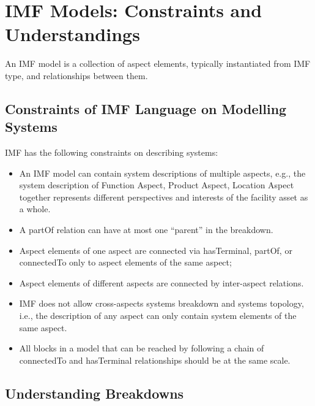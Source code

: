 \documentclass[../main.tex]{subfiles}
\begin{document}
\section{IMF Models: Constraints and Understandings}



An IMF model is a collection of aspect elements, typically instantiated from IMF type, and relationships between them. 


\subsection{Constraints of IMF Language on Modelling Systems}

IMF has the following constraints on describing  systems:
\begin{itemize}
    \item An IMF model can contain system descriptions of multiple aspects, e.g., the system description of Function Aspect, Product Aspect, Location Aspect together represents different perspectives and interests of the facility asset as a whole.
    \item A partOf relation can have at most one ``parent'' in the breakdown.
    \item Aspect elements of one aspect are connected via hasTerminal, partOf, or connectedTo only to aspect elements of the same aspect;
    \item Aspect elements of different aspects are connected by inter-aspect relations.
    \item IMF does not allow cross-aspects systems breakdown and systems topology, i.e., the description of any aspect can only contain system elements of the same aspect.
    \item All blocks in a model that can be reached by following a chain of connectedTo and hasTerminal relationships should be at the same scale. 
\end{itemize}

\subsection{Understanding Breakdowns}
\end{document}
